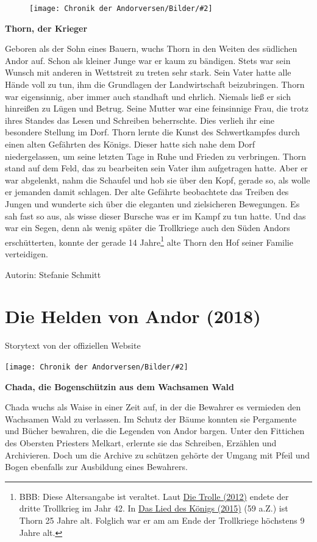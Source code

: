 \documentclass[10pt, a4paper, oneside]{book}
\newcommand{\fillbreak}{\vspace*{\fill}\columnbreak}
\newcommand{\storytext}[1]{%
    \section{#1}%
    \label{Storytext: #1}%
}
\newcommand{\refprodukt}[1]{\hyperref[Produkt: #1]{#1}}
\newcommand{\refstorytext}[1]{\hyperref[Storytext: #1]{#1}}
\newcommand{\bildmitts}[2][height=0.32\textwidth,width=0.48\textwidth,keepaspectratio]{%
    \begin{center}
        \texttt{[image: Chronik der Andorversen/Bilder/\#2]}
    \end{center}
}
\newcommand{\bildlinks}[2][height=0.32\textwidth,width=0.48\textwidth,keepaspectratio]{%
    \begin{figure}
        \texttt{[image: Chronik der Andorversen/Bilder/\#2]}
    \end{figure}
}
\begin{document}
\begin{multicols}{2}
\bildlinks[width=0.1\textwidth]{Die Helden Thorn.jpg}

\textbf{Thorn, der Krieger}

Geboren als der Sohn eines Bauern, wuchs Thorn in den Weiten des südlichen Andor auf. Schon als kleiner Junge war er kaum zu bändigen. Stets war sein Wunsch mit anderen in Wettstreit zu treten sehr stark. Sein Vater hatte alle Hände voll zu tun, ihm die Grundlagen der Landwirtschaft beizubringen. Thorn war eigensinnig, aber immer auch standhaft und ehrlich. Niemals ließ er sich hinreißen zu Lügen und Betrug. Seine Mutter war eine feinsinnige Frau, die trotz ihres Standes das Lesen und Schreiben beherrschte. Dies verlieh ihr eine besondere Stellung im Dorf. Thorn lernte die Kunst des Schwertkampfes durch einen alten Gefährten des Königs. Dieser hatte sich nahe dem Dorf niedergelassen, um seine letzten Tage in Ruhe und Frieden zu verbringen. Thorn stand auf dem Feld, das zu bearbeiten sein Vater ihm aufgetragen hatte. Aber er war abgelenkt, nahm die Schaufel und hob sie über den Kopf, gerade so, als wolle er jemanden damit schlagen. Der alte Gefährte beobachtete das Treiben des Jungen und wunderte sich über die eleganten und zielsicheren Bewegungen. Es sah fast so aus, als wisse dieser Bursche was er im Kampf zu tun hatte. Und das war ein Segen, denn als wenig später die Trollkriege auch den Süden Andors erschütterten, konnte der gerade 14 Jahre\footnote{BBB: Diese Altersangabe ist veraltet. Laut \refstorytext{Die Trolle (2012)} endete der dritte Trollkrieg im Jahr 42. In \refprodukt{Das Lied des Königs (2015)} (59 a.Z.) ist Thorn 25 Jahre alt. Folglich war er am am Ende der Trollkriege höchstens 9 Jahre alt.} alte Thorn den Hof seiner Familie verteidigen.\bigskip

Autorin: Stefanie Schmitt




\fillbreak
\storytext{Die Helden von Andor (2018)}

\begin{center}
    Storytext von der offiziellen Website
\end{center}

\bildmitts{Die Helden Bild 1.jpg}

\textbf{Chada, die Bogenschützin aus dem Wachsamen Wald}

Chada wuchs als Waise in einer Zeit auf, in der die Bewahrer es vermieden den Wachsamen Wald zu verlassen. Im Schutz der Bäume konnten sie Pergamente und Bücher bewahren, die die Legenden von Andor bargen. Unter den Fittichen des Obersten Priesters Melkart, erlernte sie das Schreiben, Erzählen und Archivieren. Doch um die Archive zu schützen gehörte der Umgang mit Pfeil und Bogen ebenfalls zur Ausbildung eines Bewahrers.


\end{multicols}
\end{document}

